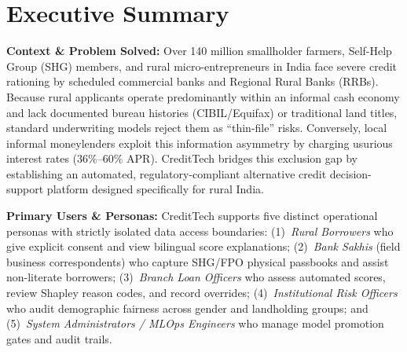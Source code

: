 \documentclass[11pt,a4paper,oneside]{report}
\begin{document}

\chapter*{Executive Summary}

\noindent\textbf{Context \& Problem Solved:} Over 140 million smallholder farmers, Self-Help Group (SHG) members, and rural micro-entrepreneurs in India face severe credit rationing by scheduled commercial banks and Regional Rural Banks (RRBs). Because rural applicants operate predominantly within an informal cash economy and lack documented bureau histories (CIBIL/Equifax) or traditional land titles, standard underwriting models reject them as ``thin-file'' risks. Conversely, local informal moneylenders exploit this information asymmetry by charging usurious interest rates ($36\%\text{--}60\%$ APR). CreditTech bridges this exclusion gap by establishing an automated, regulatory-compliant alternative credit decision-support platform designed specifically for rural India.

\vspace{0.3cm}
\noindent\textbf{Primary Users \& Personas:} CreditTech supports five distinct operational personas with strictly isolated data access boundaries: (1)~\textit{Rural Borrowers} who give explicit consent and view bilingual score explanations; (2)~\textit{Bank Sakhis} (field business correspondents) who capture SHG/FPO physical passbooks and assist non-literate borrowers; (3)~\textit{Branch Loan Officers} who assess automated scores, review Shapley reason codes, and record overrides; (4)~\textit{Institutional Risk Officers} who audit demographic fairness across gender and landholding groups; and (5)~\textit{System Administrators / MLOps Engineers} who manage model promotion gates and audit trails.
\end{document}
